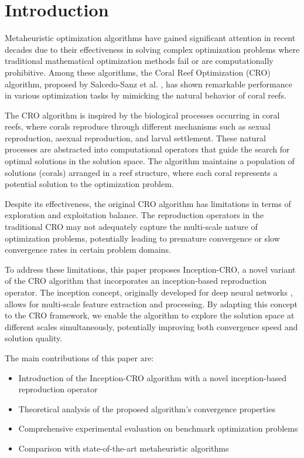 \section{Introduction}
\label{sec:introduction}

Metaheuristic optimization algorithms have gained significant attention in recent decades due to their effectiveness in solving complex optimization problems where traditional mathematical optimization methods fail or are computationally prohibitive. Among these algorithms, the Coral Reef Optimization (CRO) algorithm, proposed by Salcedo-Sanz et al. \cite{salcedo2014coral}, has shown remarkable performance in various optimization tasks by mimicking the natural behavior of coral reefs.

The CRO algorithm is inspired by the biological processes occurring in coral reefs, where corals reproduce through different mechanisms such as sexual reproduction, asexual reproduction, and larval settlement. These natural processes are abstracted into computational operators that guide the search for optimal solutions in the solution space. The algorithm maintains a population of solutions (corals) arranged in a reef structure, where each coral represents a potential solution to the optimization problem.

Despite its effectiveness, the original CRO algorithm has limitations in terms of exploration and exploitation balance. The reproduction operators in the traditional CRO may not adequately capture the multi-scale nature of optimization problems, potentially leading to premature convergence or slow convergence rates in certain problem domains.

To address these limitations, this paper proposes Inception-CRO, a novel variant of the CRO algorithm that incorporates an inception-based reproduction operator. The inception concept, originally developed for deep neural networks \cite{szegedy2015going}, allows for multi-scale feature extraction and processing. By adapting this concept to the CRO framework, we enable the algorithm to explore the solution space at different scales simultaneously, potentially improving both convergence speed and solution quality.

The main contributions of this paper are:
\begin{itemize}
    \item Introduction of the Inception-CRO algorithm with a novel inception-based reproduction operator
    \item Theoretical analysis of the proposed algorithm's convergence properties
    \item Comprehensive experimental evaluation on benchmark optimization problems
    \item Comparison with state-of-the-art metaheuristic algorithms
\end{itemize}

